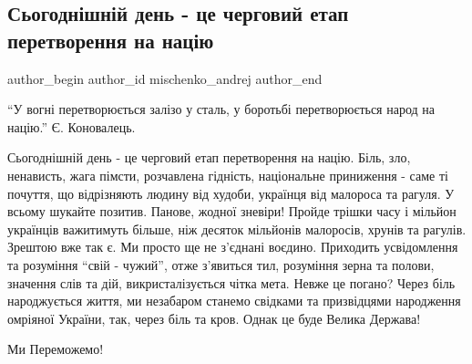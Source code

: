  
 
 
 
 
 
\subsection{Сьогоднішній день - це черговий етап перетворення на націю}
\label{sec:29_12_2019.fb.mischenko_andrej.1.peretvorennja_na_naciu}
 
\ifcmt
 author_begin
   author_id mischenko_andrej
 author_end
\fi

\enquote{У вогні перетворюється залізо у сталь, у боротьбі перетворюється народ на
націю.} Є. Коновалець. 

Сьогоднішній день - це черговий етап перетворення на націю. Біль, зло,
ненависть, жага пімсти, розчавлена гідність, національне приниження - саме ті
почуття, що відрізняють людину від худоби, українця від малороса та рагуля. У
всьому шукайте позитив. Панове, жодної зневіри! Пройде трішки часу і мільйон
українців важитимуть більше, ніж десяток мільйонів малоросів, хрунів та
рагулів. Зрештою вже так є. Ми просто ще не з'єднані воєдино. Приходить
усвідомлення та розуміння \enquote{свій - чужий}, отже з'явиться тил, розуміння зерна
та полови, значення слів та дій, викристалізується чітка мета. Невже це погано?
Через біль народжується життя, ми незабаром станемо свідками та призвідцями
народження омріяної України, так, через біль та кров. Однак це буде Велика
Держава! 

Ми Переможемо!


